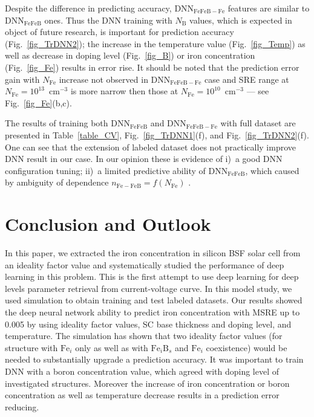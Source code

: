 \documentclass[a4paper,fleqn]{cas-sc}
\begin{document}
Despite the difference in predicting accuracy,
DNN$_\mathrm{FeFeB-Fe}$ features are similar to DNN$_\mathrm{FeFeB}$ ones.
Thus
the DNN training with $N_\mathrm{B}$ values, which is expected in object of future research,
is important for prediction accuracy (Fig.~\ref{fig_TrDNN2});
the increase in the temperature value (Fig.~\ref{fig_Temp}) as well as decrease
in doping level (Fig.~\ref{fig_B}) or iron concentration (Fig.~\ref{fig_Fe})
results in error rise.
It should be noted that the prediction error gain with $N_\mathrm{Fe}$ increase not observed in DNN$_\mathrm{FeFeB-Fe}$ case and SRE range at $N_\mathrm{Fe}=10^{13}$~cm$^{-3}$ is more narrow then those at $N_\mathrm{Fe}=10^{10}$~cm$^{-3}$ --- see Fig.~\ref{fig_Fe}(b,c).

The results of training both DNN$_\mathrm{FeFeB}$ and DNN$_\mathrm{FeFeB-Fe}$ with full dataset
are presented in Table~\ref{table_CV}, Fig.~\ref{fig_TrDNN1}(f), and Fig.~\ref{fig_TrDNN2}(f).
One can see that the extension of labeled dataset does not practically improve DNN result in our case.
In our opinion these is evidence of 
i)~a good DNN configuration tuning;
ii)~a limited predictive ability of DNN$_\mathrm{FeFeB}$, 
which caused by ambiguity of dependence $n_\mathrm{Fe-FeB}=f(N_\mathrm{Fe})$ .


\section{Conclusion and Outlook}
In this paper,
we extracted the iron concentration in silicon BSF solar cell from an  
ideality factor value and systematically studied the performance
of deep learning in this problem.
This is the first attempt to use deep learning for deep levels parameter
retrieval from current-voltage curve.
In this model study, we used simulation to obtain training and test labeled datasets.
Our results showed the deep neural network ability  
to predict iron concentration with MSRE up to 0.005 by using ideality factor values,
SC base thickness and doping level, and temperature.
The simulation has shown that two ideality factor values (for structure with $\mathrm{Fe}_i$ only as well as with $\mathrm{Fe}_i\mathrm{B}_s$ and $\mathrm{Fe}_i$ coexistence) would be needed to substantially upgrade a prediction accuracy.
It was important to train DNN with a boron concentration value,
which agreed with doping level of investigated structures.
Moreover the increase of iron concentration or boron concentration as well as temperature decrease
results in a prediction error reducing. 
\end{document}
